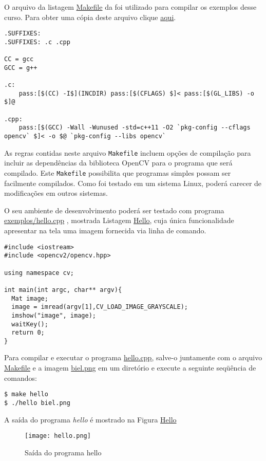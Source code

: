 \documentclass[11pt]{amsbook}
\begin{document}
O arquivo da listagem \hyperlink{exemplo-makefile}{Makefile} da foi utilizado para
compilar os exemplos desse curso. Para obter uma cópia deste arquivo
clique \href{exemplos/Makefile}{aqui}.


\begin{verbatim}
.SUFFIXES:
.SUFFIXES: .c .cpp

CC = gcc
GCC = g++

.c:
	pass:[$(CC) -I$](INCDIR) pass:[$(CFLAGS) $]< pass:[$(GL_LIBS) -o $]@

.cpp:
	pass:[$(GCC) -Wall -Wunused -std=c++11 -O2 `pkg-config --cflags opencv` $]< -o $@ `pkg-config --libs opencv`
\end{verbatim}

As regras contidas neste arquivo \texttt{Makefile} incluem opções de compilação
para incluir as dependências da biblioteca OpenCV para o programa que
será compilado. Este \texttt{Makefile} possibilita que programas simples possam
ser facilmente compilados. Como foi testado em um sistema Linux, poderá
carecer de modificações em outros sistemas.


O seu ambiente de desenvolvimento poderá ser testado com programa
\href{exemplos/hello.cpp}{exemplos/hello.cpp} , mostrada Listagem \hyperlink{exa-hello}{Hello}, cuja
única funcionalidade apresentar na tela uma imagem fornecida via linha
de comando.


\begin{verbatim}
#include <iostream>
#include <opencv2/opencv.hpp>

using namespace cv;

int main(int argc, char** argv){
  Mat image;
  image = imread(argv[1],CV_LOAD_IMAGE_GRAYSCALE);
  imshow("image", image);
  waitKey();
  return 0;
}
\end{verbatim}

Para compilar e executar o programa
\href{exemplos/hello.cpp}{hello.cpp}, salve-o juntamente com o arquivo
\href{exemplos/Makefile}{Makefile} e a imagem
\href{figs/biel.png}{biel.png} em um diretório e execute a seguinte
seqüência de comandos:


\begin{verbatim}
$ make hello
$ ./hello biel.png
\end{verbatim}

A saída do programa \emph{hello} é mostrado na Figura \hyperlink{fig-hello}{Hello}


\begin{figure}[h]{}
\centering\texttt{[image: hello.png]}
\caption{Saída do programa hello}

\end{figure}
\end{document}
